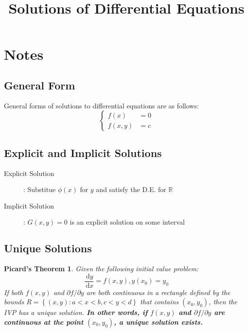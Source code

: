 \documentclass{article}
\title{Solutions of Differential Equations}
\date{}
\author{}
\newcommand{\ud}{\, \mathrm{d}}
\newtheorem{picard}{Picard's Theorem}
\begin{document}
\maketitle
\section{Notes}
\subsection{General Form}
General forms of solutions to differential equations are as follows:
\begin{equation}
	\begin{cases}
	f(x) & = 0 \\
	f(x, y) & = c
	\end{cases}
\end{equation}
\subsection{Explicit and Implicit Solutions}
\begin{description}
	\item[Explicit Solution]: Substitue $\phi(x)$ for $y$ and satisfy the 
	D.E. for $\mathbb{R}$
	\item[Implicit Solution]: $G(x, y) = 0$ is an explicit solution on some interval
\end{description}
\subsection{Unique Solutions}
\begin{picard}
	Given the following initial value problem:
	\begin{equation}
	\frac{\ud y}{\ud x} = f(x, y), y(x_0) = y_0
	\end{equation}
	If both $f(x, y)$ and $\partial f / \partial y$ are both continuous in a rectangle
	defined by the bounds $R = \left\{(x, y): a<x<b, c<y<d\right\}$ that contains $(x_0, y_0)$,
	then the IVP has a unique solution. \emph{\textbf{In other words, if $f(x, y)$ and $\partial f / \partial y$ are continuous at the point $(x_0, y_0)$, a unique solution exists.}}
\end{picard}
\end{document}
